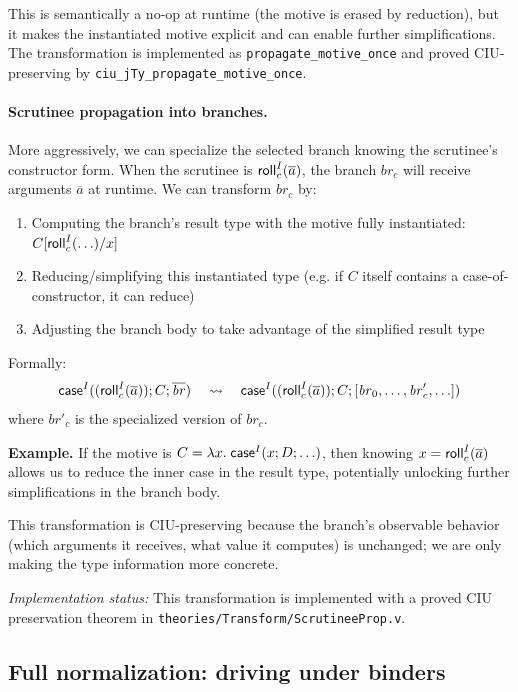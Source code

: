This is semantically a no-op at runtime (the motive is erased by reduction), but it makes the instantiated motive explicit and can enable further simplifications.
The transformation is implemented as \texttt{propagate\_motive\_once} and proved CIU-preserving by \texttt{ciu\_jTy\_propagate\_motive\_once}.

\paragraph{Scrutinee propagation into branches.}
More aggressively, we can specialize the selected branch knowing the scrutinee's constructor form.
When the scrutinee is \(\mathsf{roll}^{I}_{c}(\overline{a})\), the branch \(\mathit{br}_c\) will receive arguments \(\overline{a}\) at runtime.
We can transform \(\mathit{br}_c\) by:
\begin{enumerate}
\item Computing the branch's result type with the motive fully instantiated: \(C[\mathsf{roll}^{I}_{c}(\ldots)/x]\)
\item Reducing/simplifying this instantiated type (e.g. if \(C\) itself contains a case-of-constructor, it can reduce)
\item Adjusting the branch body to take advantage of the simplified result type
\end{enumerate}

Formally:
\[
\mathsf{case}^{I}((\mathsf{roll}^{I}_{c}(\overline{a}));C;\overline{\mathit{br}})
\quad\leadsto\quad
\mathsf{case}^{I}((\mathsf{roll}^{I}_{c}(\overline{a}));C;[\mathit{br}_0,\ldots,\mathit{br}'_c,\ldots])
\]
where \(\mathit{br}'_c\) is the specialized version of \(\mathit{br}_c\).

\textbf{Example.} If the motive is \(C = \lambda x.\;\mathsf{case}^{I}(x;D;\ldots)\), then knowing \(x = \mathsf{roll}^{I}_{c}(\overline{a})\) allows us to reduce the inner case in the result type, potentially unlocking further simplifications in the branch body.

This transformation is CIU-preserving because the branch's observable behavior (which arguments it receives, what value it computes) is unchanged; we are only making the type information more concrete.

\emph{Implementation status:} This transformation is implemented with a proved CIU preservation theorem in \texttt{theories/Transform/ScrutineeProp.v}.

\subsection{Full normalization: driving under binders}

